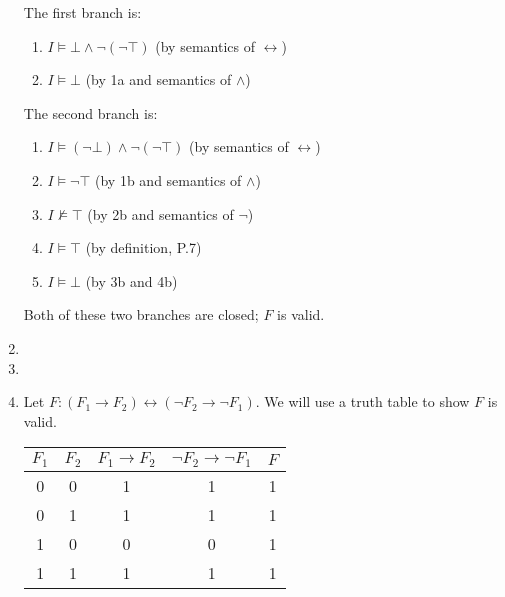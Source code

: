 \begin{exer}[1.2]
\begin{enumerate}[label=(\alph*)]
            The first branch is:
            \begin{enumerate}[label=\arabic*a.]
                \item %
                    $I \models \bot \land \neg (\neg \top)$ (by semantics of $\leftrightarrow$)
                \item %
                    $I \models \bot$ (by 1a and semantics of $\land$)
            \end{enumerate}

            The second branch is:
            \begin{enumerate}[label=\arabic*b.]
                \item %
                    $I \models (\neg \bot) \land \neg (\neg \top)$ (by semantics of $\leftrightarrow$)
                \item %
                    $I \models \neg\top$ (by 1b and semantics of $\land$)
                \item %
                    $I \not\models \top$ (by 2b and semantics of $\neg$)
                \item %
                    $I \models \top$ (by definition, P.7)
                \item %
                    $I \models \bot$ (by 3b and 4b)
            \end{enumerate}
            Both of these two branches are closed; $F$ is valid.
            \addtocounter{enumi}{14} %
        \item %
        \item %
        \item %
            Let $F: (F_1 \rightarrow F_2) \leftrightarrow (\neg F_2 \rightarrow \neg F_1)$.
            We will use a truth table to show $F$ is valid.
            \begin{center}
                \begin{tabular}{ |c|c||c|c|c| }
                    \hline
                        $F_1$ & $F_2$ & $F_1 \rightarrow F_2$ & $\neg F_2 \rightarrow \neg F_1$ & $F$ \\ \hline
                        0 & 0 & 1 & 1 & 1 \\ \hline
                        0 & 1 & 1 & 1 & 1 \\ \hline
                        1 & 0 & 0 & 0 & 1 \\ \hline
                        1 & 1 & 1 & 1 & 1 \\ \hline
                \end{tabular}

\end{center}
\end{enumerate}
\end{exer}
